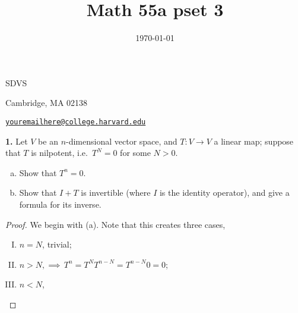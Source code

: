 \documentclass[12pt]{amsart}
\title{Math 55a pset 3} %
\date{\today}
\newenvironment{statement}[1]{\smallskip\noindent\color[rgb]{1.00,0.00,0.50} {\bf #1.}}{}
\theoremstyle{definition}
\theoremstyle{remark}
\begin{document}
\maketitle

\vspace*{-0.25in}
\centerline{SDVS}
\centerline{}
\centerline{Cambridge, MA 02138}
\centerline{\href{mailto:youremailhere@college.harvard.edu}{{\tt youremailhere@college.harvard.edu}}}
\vspace*{0.15in}



\begin{statement}{1}
 Let $V$ be an $n$-dimensional vector space, and $T : V \to V$ a linear map; suppose that
$T$ is nilpotent, i.e.\ $T^N = 0$ for some $N > 0$.

  \begin{enumerate}[(a)]
    \item Show that $T^n = 0$.

    \item   Show that \( I+T \) is invertible (where \( I \) is the identity operator), and give a formula for its inverse. 
  \end{enumerate}
\end{statement}

\begin{proof}
We begin with (a). Note that this creates three cases, 
\begin{enumerate}[I.]
  \item \( n=N \), trivial;
  \item \( n>N, \implies \, T^n=T^NT^{n-N}=T^{n-N}0=0 \);
  \item \( n<N \), 
\end{enumerate}
\end{proof}
\end{document}
